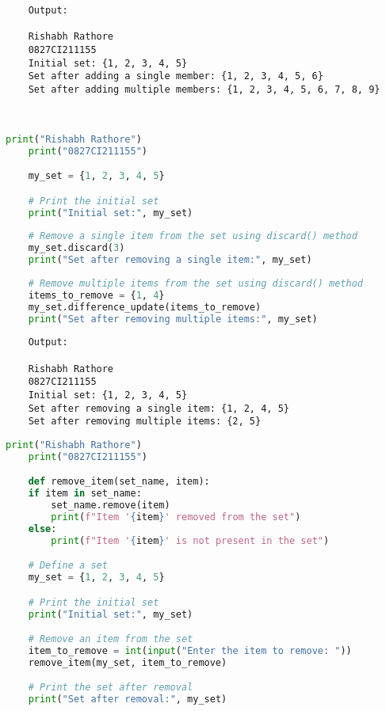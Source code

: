 \documentclass{report}
\begin{document}
\begin{verbatim}
	Output:

	Rishabh Rathore
	0827CI211155
	Initial set: {1, 2, 3, 4, 5}
	Set after adding a single member: {1, 2, 3, 4, 5, 6}
	Set after adding multiple members: {1, 2, 3, 4, 5, 6, 7, 8, 9}

	

\end{verbatim}


\bigskip


\sol 
\begin{lstlisting}[language=Python]
	print("Rishabh Rathore")
	print("0827CI211155")

	my_set = {1, 2, 3, 4, 5}

	# Print the initial set
	print("Initial set:", my_set)
	
	# Remove a single item from the set using discard() method
	my_set.discard(3)
	print("Set after removing a single item:", my_set)
	
	# Remove multiple items from the set using discard() method
	items_to_remove = {1, 4}
	my_set.difference_update(items_to_remove)
	print("Set after removing multiple items:", my_set)
\end{lstlisting}

\begin{verbatim}
	Output:

	Rishabh Rathore
	0827CI211155
	Initial set: {1, 2, 3, 4, 5}
	Set after removing a single item: {1, 2, 4, 5}
	Set after removing multiple items: {2, 5}

\end{verbatim}


\bigskip


\sol 
\begin{lstlisting}[language=Python]
	print("Rishabh Rathore")
	print("0827CI211155")

	def remove_item(set_name, item):
    if item in set_name:
        set_name.remove(item)
        print(f"Item '{item}' removed from the set")
    else:
        print(f"Item '{item}' is not present in the set")

	# Define a set
	my_set = {1, 2, 3, 4, 5}

	# Print the initial set
	print("Initial set:", my_set)

	# Remove an item from the set
	item_to_remove = int(input("Enter the item to remove: "))
	remove_item(my_set, item_to_remove)

	# Print the set after removal
	print("Set after removal:", my_set)
\end{lstlisting}
\end{document}
